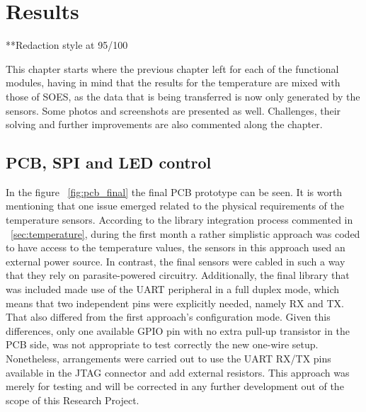 \chapter{Results}\label{cha:results}
**Redaction style at 95/100

        
This chapter starts where the previous chapter left for each of the functional modules, having in mind that the results for the 
temperature are mixed with those of SOES, as the data that is being transferred is now only generated by the sensors. Some photos
and screenshots are presented as well. Challenges, their solving and further improvements are also commented along the chapter.


\section{PCB, SPI and LED control}

In the figure ~\ref{fig:pcb_final} the final PCB prototype can be seen. It is worth mentioning that one issue
emerged
related to the physical requirements of the temperature sensors. 
According to the library integration process commented in ~\ref{sec:temperature}, 
during the first month a rather simplistic approach was coded to have access to the temperature values, the sensors in this approach
used an 
external power source. In contrast, the final sensors were cabled in such a way that they rely on parasite-powered circuitry.
Additionally, the final library that was included made use of the UART peripheral in a full duplex mode, which means that two independent 
pins were explicitly needed, namely RX and TX. That also differed from the first approach's configuration mode. Given this differences, 
only one available GPIO pin with no extra pull-up transistor in the PCB side, was not appropriate to test correctly the 
new one-wire setup. Nonetheless, arrangements were carried out to use the UART RX/TX pins available in the JTAG connector and add external resistors. 
This approach was merely for testing and will be corrected in any further development out of the scope of this Research Project.

